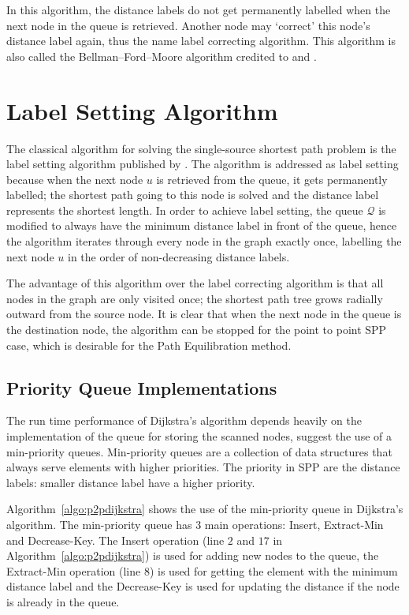 In this algorithm,
the distance labels do not get permanently labelled when the next node in the queue is retrieved.
Another node may `correct' this node's distance label again,
thus the name label correcting algorithm.
This algorithm is also called the Bellman–Ford–Moore algorithm credited to \citet{Bellman, Ford} and \citet{Moore}.

\section{Label Setting Algorithm}
\label{section:labelsettingalgorithm}
The classical algorithm for solving the single-source shortest path problem is the label setting algorithm published by \citet{Dijkstra}.
The algorithm is addressed as label setting because when the next node $u$ is retrieved from the queue,
it gets permanently labelled;
the shortest path going to this node is solved and 
the distance label represents the shortest length.
In order to achieve label setting, 
the queue $\mathcal{Q}$ is modified to always have the minimum distance label in front of the queue,
hence the algorithm iterates through every node in the graph exactly once,
labelling the next node $u$ in the order of non-decreasing distance labels.

The advantage of this algorithm over the label correcting algorithm is
that all nodes in the graph are only visited once;
the shortest path tree grows radially outward from the source node.
It is clear that when the next node in the queue is the destination node,
the algorithm can be stopped for the point to point SPP case,
which is desirable for the Path Equilibration method.

\subsection{Priority Queue Implementations}
The run time performance of Dijkstra's algorithm depends heavily on the implementation of the queue for storing the scanned nodes,
\citet{Cormen} suggest the use of a min-priority queues.
Min-priority queues are a collection of data structures that always serve elements with higher priorities. The priority in SPP are the distance labels:
smaller distance label have a higher priority.

Algorithm~\ref{algo:p2pdijkstra} shows the use of the min-priority queue in Dijkstra's algorithm.
The min-priority queue has 3 main operations: Insert, Extract-Min and Decrease-Key.
The Insert operation (line $2$ and $17$ in Algorithm~\ref{algo:p2pdijkstra}) is used for adding new nodes to the queue, the Extract-Min operation (line 8) is used for getting the element with the minimum distance label and the Decrease-Key is used for updating the distance if the node is already in the queue.

